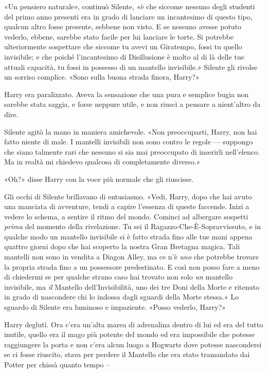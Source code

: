 «Un pensiero naturale», continuò Silente, «è che siccome nessuno degli studenti del primo anno presenti era in grado di lanciare un incantesimo di questo tipo, qualcun altro fosse presente, sebbene non visto. E se nessuno avesse potuto vederlo, ebbene, sarebbe stato facile per lui lanciare le torte. Si potrebbe ulteriormente sospettare che siccome tu avevi un Giratempo, fossi tu quello invisibile; e che poiché l’incantesimo di Disillusione è molto al di là delle tue attuali capacità, tu fossi in possesso di un mantello invisibile.» Silente gli rivolse un sorriso complice. «Sono sulla buona strada finora, Harry?»

Harry era paralizzato. Aveva la sensazione che una pura e semplice bugia non sarebbe stata saggia, e forse neppure utile, e non riuscì a pensare a nient’altro da dire.

Silente agitò la mano in maniera amichevole. «Non preoccuparti, Harry, non hai fatto niente di male. I mantelli invisibili non sono contro le regole — suppongo che siano talmente rari che nessuno si sia mai preoccupato di inserirli nell’elenco. Ma in realtà mi chiedevo qualcosa di completamente diverso.»

«Oh?» disse Harry con la voce più normale che gli riuscisse.

Gli occhi di Silente brillavano di entusiasmo. «Vedi, Harry, dopo che hai avuto una manciata di avventure, tendi a capire l’essenza di queste faccende. Inizi a vedere lo schema, a sentire il ritmo del mondo. Cominci ad albergare sospetti \textit{prima} del momento della rivelazione. Tu sei il Ragazzo-Che-È-Sopravvissuto, e in qualche modo un mantello invisibile si è fatto strada fino alle tue mani appena quattro giorni dopo che hai scoperto la nostra Gran Bretagna magica. Tali mantelli non sono in vendita a Diagon Alley, ma ce n’è \textit{uno} che potrebbe trovare la propria strada fino a un possessore predestinato. E così non posso fare a meno di chiedermi se per qualche strano caso hai trovato non solo \textit{un} mantello invisibile, ma \textit{il} Mantello dell’Invisibilità, uno dei tre Doni della Morte e ritenuto in grado di nascondere chi lo indossa dagli sguardi della Morte stessa.» Lo sguardo di Silente era luminoso e impaziente. «Posso vederlo, Harry?»

Harry deglutì. Ora c’era un’alta marea di adrenalina dentro di lui ed era del tutto inutile, quello era il mago più potente del mondo ed era impossibile che potesse raggiungere la porta e non c’era alcun luogo a Hogwarts dove potesse nascondersi se ci fosse riuscito, stava per perdere il Mantello che era stato tramandato dai Potter per chissà quanto tempo –

